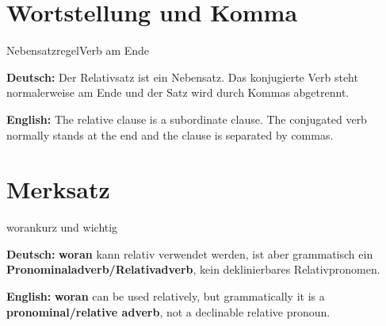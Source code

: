 \documentclass[a4paper,11pt]{article}
\newcommand{\GermanText}[1]{\textbf{Deutsch: }#1\par}
\newcommand{\EnglishText}[1]{{\small\color{SoftGray}\textbf{English: }#1\par}}
\begin{document}
\section{Wortstellung und Komma}

\begin{grammarentry}{Nebensatzregel}{Verb am Ende}

\GermanText{Der Relativsatz ist ein Nebensatz. Das konjugierte Verb steht normalerweise am Ende und der Satz wird durch Kommas abgetrennt.}

\EnglishText{The relative clause is a subordinate clause. The conjugated verb normally stands at the end and the clause is separated by commas.}

\end{grammarentry}

\section{Merksatz}

\begin{grammarentry}{woran}{kurz und wichtig}

\GermanText{\textbf{woran} kann relativ verwendet werden, ist aber grammatisch ein \textbf{Pronominaladverb/Relativadverb}, kein deklinierbares Relativpronomen.}

\EnglishText{\textbf{woran} can be used relatively, but grammatically it is a \textbf{pronominal/relative adverb}, not a declinable relative pronoun.}

\end{grammarentry}
\end{document}

